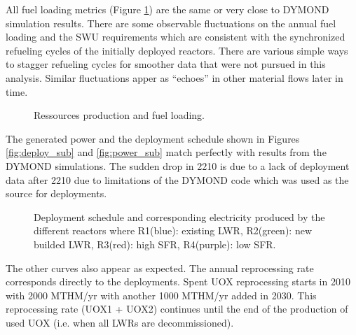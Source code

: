 \documentclass[12pt]{article}
\begin{document}
All fuel loading metrics (Figure \ref{fig:RessourceUsed}) are the same or very
close to DYMOND simulation results. There are some observable fluctuations on
the annual fuel loading and the SWU requirements which are consistent with the
synchronized refueling cycles of the initially deployed reactors.  There are
various simple ways to stagger refueling cycles for smoother data that were
not pursued in this analysis.  Similar fluctuations apper as ``echoes'' in 
other material flows later in time.

\begin{figure}[h!]
    \centering
    \caption{Ressources production and fuel loading.\label{fig:RessourceUsed} }
\end{figure}

The generated power and the deployment schedule shown in Figures
\ref{fig:deploy_sub} and \ref{fig:power_sub} match perfectly with results from
the DYMOND simulations. The sudden drop in 2210 is due to a lack of deployment
data after 2210 due to limitations of the DYMOND code which was used as the
source for deployments.


\begin{figure}[h!]
    \centering
    \caption{Deployment schedule and corresponding
    electricity produced by the different reactors
    where R1(blue): existing LWR, R2(green): new
    builded LWR, R3(red): high SFR, R4(purple): low
    SFR.\label{fig:deployment_bis} }
\end{figure}

The other curves also appear as expected. The annual reprocessing rate
corresponds directly to the deployments. Spent UOX reprocessing starts in 2010
with 2000 MTHM/yr with another 1000 MTHM/yr added in 2030.  This reprocessing
rate (UOX1 + UOX2) continues until the end of the production of used UOX (i.e.
when all LWRs are decommissioned).
\end{document}
